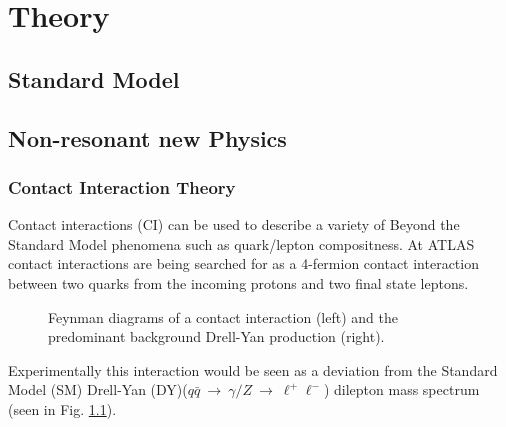 \chapter{Theory}

\section{Standard Model}


\section{Non-resonant new Physics}
\subsection{Contact Interaction Theory}

Contact interactions (CI) can be used to describe a variety of Beyond the Standard Model phenomena such as quark/lepton compositness. At ATLAS contact interactions are being searched for as a 4-fermion contact interaction between two quarks from the incoming protons and two final state leptons.

\begin{figure}[h!p]
\centering
\centering
\caption{Feynman diagrams of a contact interaction (left) and the predominant background Drell-Yan production (right).}
\label{fig:fd}
\end{figure}

Experimentally this interaction would be seen as a deviation from the Standard Model (SM) Drell-Yan (DY)($q\bar{q}~\rightarrow~\gamma/Z~\rightarrow~\ell^{+}\ell^{-}$) dilepton mass spectrum (seen in Fig. \ref{fig:fd}). 

